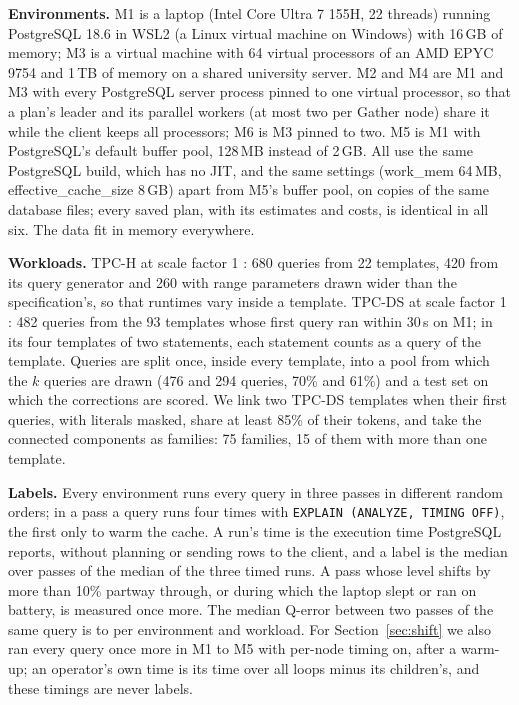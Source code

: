 \documentclass[sigconf,review]{acmart}
\begin{document}
\textbf{Environments.} M1 is a laptop (Intel Core Ultra 7 155H, 22
threads) running PostgreSQL 18.6 in WSL2 (a Linux virtual machine on
Windows) with 16\,GB of memory; M3 is a virtual machine with 64 virtual
processors of an AMD EPYC 9754 and 1\,TB of memory on a shared university
server. M2 and M4 are M1 and M3 with every
PostgreSQL server process pinned to one virtual processor, so that a plan's
leader and its parallel workers (at most two per Gather node) share it
while the client keeps all processors; M6 is M3 pinned to two. M5 is M1
with PostgreSQL's default buffer pool, 128\,MB instead of 2\,GB. All use
the same PostgreSQL build, which has no JIT, and the same settings
(work\_mem 64\,MB, effective\_cache\_size 8\,GB) apart from M5's buffer
pool, on copies of the same database files; every saved plan, with its
estimates and costs, is identical in all six. The data fit in memory
everywhere.

\textbf{Workloads.} TPC-H at scale factor 1 \cite{tpch}: 680 queries from
22 templates, 420 from its query generator and 260 with range parameters
drawn wider than the specification's, so that runtimes vary inside a
template. TPC-DS at scale factor 1 \cite{tpcds}: 482 queries from the 93
templates whose first query ran within 30\,s on M1; in its four templates
of two statements, each statement counts as a query of the template.
Queries are split once, inside every template, into a pool from which the
$k$ queries are drawn (476 and 294 queries, 70\% and 61\%) and a test set
on which the corrections are scored. We link two TPC-DS templates when their first
queries, with literals masked, share at least 85\% of their tokens, and take
the connected components as families: 75 families, 15 of them with more
than one template.

\textbf{Labels.} Every environment runs every query in three passes in
different random orders; in a pass a query runs four times with
\texttt{EXPLAIN (ANALYZE, TIMING OFF)}, the first only to warm the cache.
A run's time is the execution time PostgreSQL reports, without planning or
sending rows to the client, and a label is the median over passes of the
median of the three timed runs. A pass whose level shifts by more than 10\%
partway through, or during which the laptop slept or ran on battery, is
measured once more. The median Q-error between two passes of the same
query is \NoiseMedQMin{} to \NoiseMedQMax{} per environment and workload.
For Section~\ref{sec:shift} we also ran every query once more in M1 to M5
with per-node timing on, after a warm-up; an operator's own time is its
time over all loops minus its children's, and these timings are never
labels.
\end{document}
